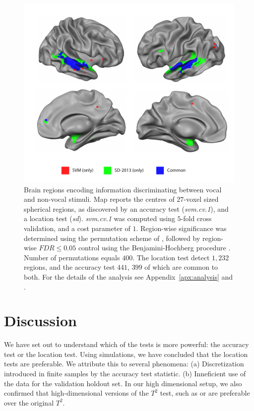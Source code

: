 \documentclass[12pt,a4paper]{article}
\begin{document}
\begin{figure}[th]
\centering
\includegraphics[width=0.7\linewidth]{"art/svm_vs_SD"}
\caption{\footnotesize
Brain regions encoding information discriminating between vocal and non-vocal stimuli.
Map reports the centres of $27$-voxel sized spherical regions, as discovered by an accuracy test (\emph{svm.cv.1}), and a location test (\emph{sd}). 
\emph{svm.cv.1} was computed using $5$-fold cross validation, and a cost parameter of $1$. 
Region-wise significance was determined using the permutation scheme of \cite{stelzer_statistical_2013}, followed by region-wise $FDR \leq 0.05$ control using the Benjamini-Hochberg procedure \citep{benjamini_controlling_1995}.
Number of permutations equals $400$.
The location test detect $1,232$ regions, and the accuracy test $441$, $399$ of which are common to both.
For the details of the analysis see Appendix~\ref{apx:analysis} and \cite{gilron_quantifying_2016}.  
  }
\label{fig:read_data}
\end{figure}








\section{Discussion}
\label{sec:discussion}


We have set out to understand which of the tests is more powerful: the accuracy test or the location test. 
Using simulations, we have concluded that the location tests are preferable. 
We attribute this to several phenomena: 
(a) Discretization introduced in finite samples by the accuracy test statistic. 
(b) Inneficient use of the data for the validation holdout set. 
In our high dimensional setup, we also confirmed that high-dimensional versions of the $T^2$ test, such as \cite{srivastava_testing_2013} or \cite{schafer_shrinkage_2005} are preferable over the original $T^2$. 
\end{document}
